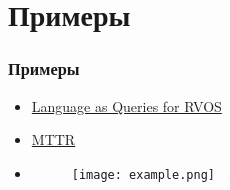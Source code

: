 
\section{Примеры}
\begin{frame}
    \frametitle{Примеры}
    \begin{itemize}
        \item \textcolor{blue}{\href{https://github.com/wjn922/ReferFormer}{Language as Queries for RVOS}}
        \item \textcolor{blue}{\href{https://github.com/mttr2021/MTTR/tree/c383c5b151e3c97aeb45cd2fb4bf08719016498b}{MTTR}}
        \item \begin{figure}
            \texttt{[image: example.png]}
        \end{figure}
    \end{itemize}
    
\end{frame}

